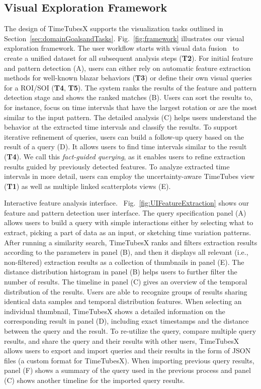 \subsection{Visual Exploration Framework\label{sec:approach}}
The design of TimeTubesX supports the visualization tasks outlined in Section~\ref{sec:domainGoalsandTasks}.
Fig.~\ref{fig:framework} illustrates our visual exploration framework.
%
The user workflow starts with visual data fusion~\cite{Fujishiro2018} to create a unified dataset for all subsequent analysis steps (\textbf{T2}).
For initial feature and pattern detection (A), users can either rely on automatic feature extraction methods for well-known blazar behaviors (\textbf{T3}) or define their own visual queries for a ROI/SOI (\textbf{T4}, \textbf{T5}).
The system ranks the results of the feature and pattern detection stage and shows the ranked matches (B).
Users can sort the results to, for instance, focus on time intervals that have the largest rotation or are the most similar to the input pattern.
The detailed analysis (C) helps users understand the behavior at the extracted time intervals and classify the results. 
To support iterative refinement of queries, users can build a follow-up query based on the result of a query (D). It allows users to find time intervals similar to the result (\textbf{T4}).
We call this \textit{fact-guided querying}, as it enables users to refine extraction results guided by previously detected features.
To analyze extracted time intervals in more detail, users can employ
the uncertainty-aware TimeTubes view (\textbf{T1}) as well as multiple linked scatterplots views (E).

\textsf{Interactive feature analysis interface.\ } 
Fig.~\ref{fig:UIFeatureExtraction} shows our feature and pattern detection user interface. 
The query specification panel (A) allows users 
to build a query with simple interactions either by selecting what to extract, picking a part of data as an input, or sketching time variation patterns.
After running a similarity search, 
TimeTubesX ranks and filters extraction results according to the parameters in panel (B),
and then it displays all relevant (i.e., non-filtered) extraction results as a collection of thumbnails in panel (E).
The distance distribution histogram in panel (B) helps users to further filter the number of results.
The timeline in panel (C) gives an overview of the temporal distribution of the results.
Users are able to recognize groups of results sharing identical data samples and temporal distribution features.
When selecting an individual thumbnail, TimeTubesX shows a detailed information on the corresponding result in panel (D), including exact timestamps and the distance between the query and the result.
To re-utilize the query, compare multiple query results, and share the query and their results with other users, 
TimeTubesX allows users to export and import queries and their results in the form of JSON files (a custom format for TimeTubesX).
When importing previous query results,
panel (F) shows a summary of the query used in the previous process and panel (C) shows another timeline for the imported query results.

